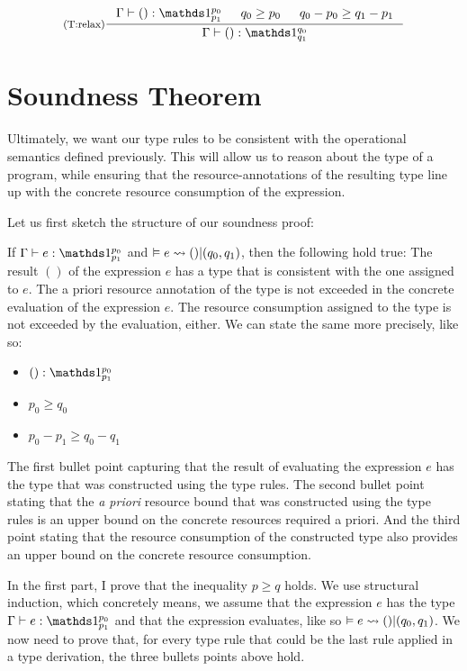 \[
   \inference[(T:relax)]
   {\Gamma \vdash () : \unit^{p_0}_{p_1}
      & 
   q_0 \geq p_0
      &
   q_0 - p_0 \geq q_1 - p_1}
   {\Gamma \vdash () : \unit^{q_0}_{q_1}}
\]


\section{Soundness Theorem}
Ultimately, we want our type rules to be consistent with the operational semantics defined previously. This will allow us to reason about the type of a program, while ensuring that the resource-annotations of the resulting type line up with the concrete resource consumption of the expression.

Let us first sketch the structure of our soundness proof:

If \(\Gamma \vdash e : \unit^{p_0}_{p_1}\) and \(\vDash e \rightsquigarrow  () | (q_0, q_1) \), then the following hold true:
The result \(()\) of the expression \(e\) has a type that is consistent with the one assigned to \(e\). The a priori resource annotation of the type is not exceeded in the concrete evaluation of the expression \(e\). The resource consumption assigned to the type is not exceeded by the evaluation, either. We can state the same more precisely, like so: 

\begin{itemize}
   \item \(() : \unit^{p_0}_{p_1}\) 
   \item \(p_0 \geq q_0\)     
   \item \(p_0 - p_1 \geq q_0 - q_1\)
\end{itemize}

The first bullet point capturing that the result of evaluating the expression \(e\) has the type that was constructed using the type rules. The second bullet point stating that the \emph{a priori} resource bound that was constructed using the type rules is an upper bound on the concrete resources required a priori. And the third point stating that the resource consumption of the constructed type also provides an upper bound on the concrete resource consumption.

In the first part, I prove that the inequality \(p \geq q\) holds. We use structural induction, which concretely means, we assume that the expression \(e\) has the type \(\Gamma \vdash e : \unit^{p_0}_{p_1}\) and that the expression evaluates, like so \(\vDash e \rightsquigarrow () | (q_0, q_1)\). We now need to prove that, for every type rule that could be the last rule applied in a type derivation, the three bullets points above hold. 

